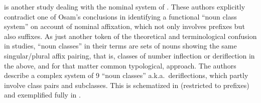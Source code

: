 \documentclass[output=collectionpaper]{langsci/langscibook}
\begin{document}
\citet{Bodomo2006} is another study dealing with the nominal system of . These authors explicitly contradict one of Osam's conclusions in identifying a functional ``noun class system'' on account of nominal affixation, which not only involves prefixes but also suffixes. As just another token of the theoretical and terminological confusion in  studies, ``noun classes'' in their terms are sets of nouns showing the same singular/plural affix pairing, that is, classes of number inflection or deriflection in the above, and for that matter common typological, approach. The authors describe a complex system of 9 ``noun classes'' a.k.a.\ deriflections, which partly involve class pairs and subclasses. This is  schematized in  (restricted to prefixes) and exemplified fully in .
\end{document}
